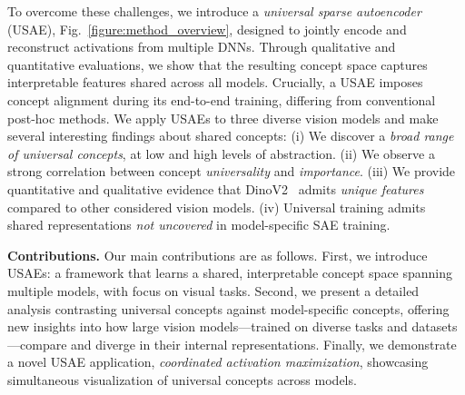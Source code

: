 To overcome these challenges, we introduce a \emph{universal sparse autoencoder} (USAE), Fig.~\ref{figure:method_overview}, designed to jointly encode and reconstruct activations from multiple DNNs. Through qualitative and quantitative evaluations, we show that the resulting concept space captures interpretable features shared across all models. Crucially, a USAE imposes concept alignment during its end-to-end training, differing from conventional post-hoc methods. 
We apply USAEs to three diverse vision models and make several interesting findings %
about shared concepts: (i) We discover a \textit{broad range of universal concepts}, at low and high levels of abstraction. (ii) We observe a strong correlation between concept \textit{universality} and \textit{importance}. (iii) We provide quantitative and qualitative evidence that DinoV2~\cite{oquab2023dinov2} admits \textit{unique features} compared to other considered vision models. (iv) Universal training admits shared representations \textit{not uncovered} in model-specific SAE training.

\noindent\textbf{Contributions.} 
Our main contributions are as follows.  
First, we introduce %
USAEs: 
a framework that learns a shared, interpretable concept space spanning multiple models, with %
focus on
visual tasks. 
Second, we present a detailed analysis contrasting universal concepts against model-specific concepts, offering new insights into how large vision models—trained on diverse tasks and datasets—compare and diverge in their internal representations.  Finally, we demonstrate a novel USAE application,  %
\emph{coordinated activation maximization}, showcasing simultaneous visualization of universal concepts across models.

